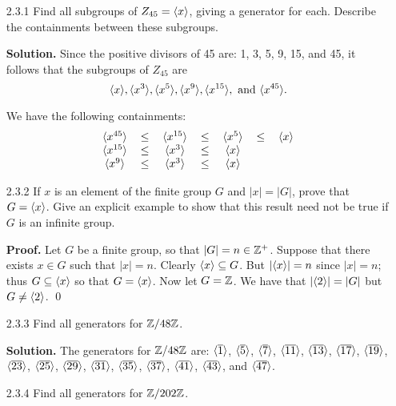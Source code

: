 \begin{enumerate}
   \item[2.3.1]   Find all subgroups of $Z_{45} = \langle x \rangle$, giving a generator
                  for each. Describe the containments between these subgroups.
                  
      \textbf{Solution.} Since the positive divisors of 45 are: 1, 3, 5, 9, 15,
      and 45, it follows that the subgroups of $Z_{45}$ are
      $$\langle x \rangle, \langle x^3 \rangle, \langle x^5 \rangle, \langle x^9 \rangle, \langle x^{15} \rangle, \text{ and }
        \langle x^{45} \rangle.$$
        
      We have the following containments:
      $$
         \begin{tabular}{>{$}c<{$}>{$}c<{$}>{$}c<{$}>{$}c<{$}>{$}c<{$}>{$}c<{$}>{$}c<{$}}
            \cyc{x^{45}} & \le & \cyc{x^{15}} & \le & \cyc{x^5} & \le & \cyc{x} \\
            \cyc{x^{15}} & \le &  \cyc{x^3} & \le & \cyc{x} \\
            \cyc{x^9} & \le &  \cyc{x^3} & \le & \cyc{x}
         \end{tabular}
      $$
   \item[2.3.2]   If $x$ is an element of the finite group $G$ and $|x| = |G|$,
                  prove that $G = \langle x \rangle$. Give an explicit example to show 
                  that this result need not be true if $G$ is an infinite group.
                  
      \textbf{Proof.} Let $G$ be a finite group, so that $|G| = n \in \mathbb{Z}^+$.
      Suppose that there exists $x \in G$ such that $|x| = n$. Clearly
      $\langle x \rangle \subseteq G$. But $|\langle x \rangle| = n$ since $|x| = n$; thus
      $G \subseteq \langle x \rangle$ so that $G = \langle x \rangle$. Now let $G = \mathbb{Z}$. We have
      that $|\langle 2 \rangle| = |G|$ but $G \neq \langle 2 \rangle$. \qed
   \item[2.3.3]   Find all generators for $\mathbb{Z}/48\mathbb{Z}$.
   
      \textbf{Solution.} The generators for $\mathbb{Z}/48\mathbb{Z}$ are: $\langle \overline{1} \rangle$,
      $\langle \overline{5} \rangle$, $\langle \overline{7} \rangle$, $\langle \overline{11} \rangle$,
      $\langle \overline{13} \rangle$, $\langle \overline{17} \rangle$, $\langle \overline{19} \rangle$,
      $\langle \overline{23} \rangle$, $\langle \overline{25} \rangle$, $\langle \overline{29} \rangle$,
      $\langle \overline{31} \rangle$, $\langle \overline{35} \rangle$, $\langle \overline{37} \rangle$,
      $\langle \overline{41} \rangle$, $\langle \overline{43} \rangle$, and $\langle \overline{47} \rangle$.
   \item[2.3.4]   Find all generators for $\mathbb{Z}/202\mathbb{Z}$.
   

\end{enumerate}
